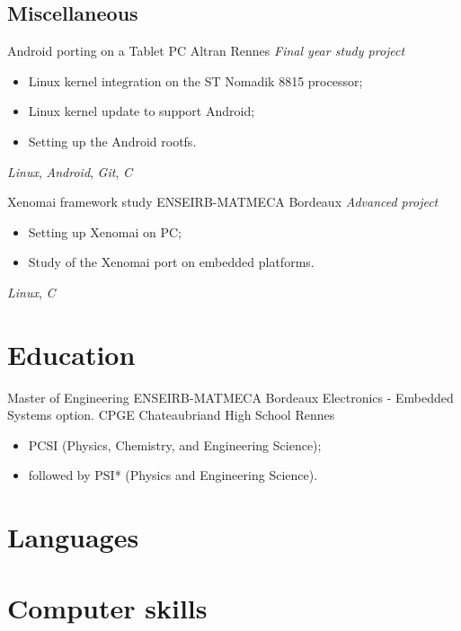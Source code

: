 \documentclass[11pt,a4paper,sans]{moderncv}
\begin{document}
\subsection{Miscellaneous}
	{Android porting on a Tablet PC}
	{Altran}
	{Rennes}
	{\textit{Final year study project}}
	{
		\begin{itemize}
		\item Linux kernel integration on the ST Nomadik 8815 processor;
		\item Linux kernel update to support Android;
		\item Setting up the Android rootfs.
		\end{itemize}
		\textit{Linux}, \textit{Android},
		\textit{Git},
		\textit{C}
	}
	{Xenomai framework study}
	{ENSEIRB-MATMECA}
	{Bordeaux}
	{\textit{Advanced project}}
	{
		\begin{itemize}
		\item Setting up Xenomai on PC;
		\item Study of the Xenomai port on embedded platforms.
		\end{itemize}
		\textit{Linux}, \textit{C}
	}

\section{Education}
	{Master of Engineering}
	{ENSEIRB-MATMECA}
	{Bordeaux}
	{}
	{Electronics - Embedded Systems option.}
	{CPGE}
	{Chateaubriand High School}
	{Rennes}
	{}
	{
		\begin{itemize}
		\item PCSI (Physics, Chemistry, and Engineering Science);
		\item followed by PSI* (Physics and Engineering Science).
		\end{itemize}
	}

\section{Languages}

\section{Computer skills}
\end{document}
